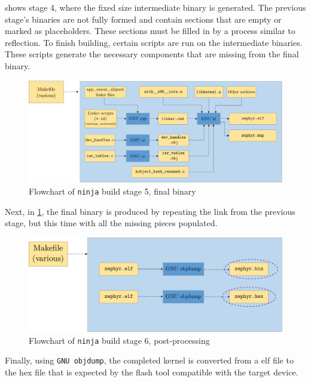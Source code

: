  shows stage 4, where the fixed size intermediate binary is generated. The previous stage's binaries are not fully formed and contain sections that are empty or marked as placeholders. These sections must be filled in by a process similar to reflection. To finish building, certain scripts are run on the intermediate binaries. These scripts generate the necessary components that are missing from the final binary.
\begin{figure}[htbp]
	\centering
	\includegraphics[width=\textwidth]{Figures/3_cmake_build5.pdf}
	\caption[Flowchart of ninja stage 5, final binary]{Flowchart of \texttt{ninja} build stage 5, final binary\cite{zephyrprojectdocumentation}}
	\label{fig:3_build5}
\end{figure}
Next, in \cref{fig:3_build5}, the final binary is produced by repeating the link from the previous stage, but this time with all the missing pieces populated.
\begin{figure}[htbp]
	\centering
	\includegraphics[width=\textwidth]{Figures/3_cmake_build6.pdf}
	\caption[Flowchart of ninja stage 6, final binary]{Flowchart of \texttt{ninja} build stage 6, post-processing\cite{zephyrprojectdocumentation}}
	\label{fig:3_build6}
\end{figure}
Finally, using \texttt{GNU objdump}, the completed kernel is converted from a \gls{elf} file to the hex file that is expected by the flash tool compatible with the target device.

